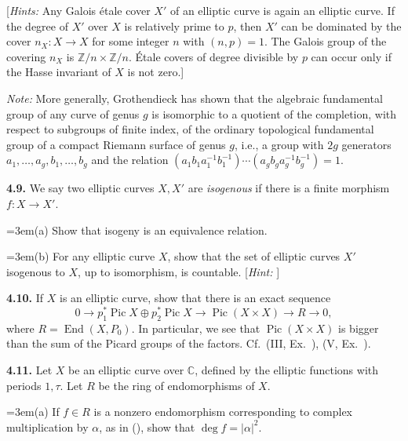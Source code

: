 {[\emph{Hints:} Any Galois \'etale cover $X'$ of an elliptic curve is again an elliptic curve. If the degree of $X'$ over $X$ is relatively prime to $p$, then $X'$ can be dominated by the cover $n_X\colon X\to X$ for some integer $n$ with $(n,p)=1$. The Galois group of the covering $n_X$ is $\mathbb Z/n\times\mathbb Z/n$. \'Etale covers of degree divisible by $p$ can occur only if the Hasse invariant of $X$ is not zero.]

\emph{Note:} More generally, Grothendieck has shown  that the algebraic fundamental group of any curve of genus $g$ is isomorphic to a quotient of the completion, with respect to subgroups of finite index, of the ordinary topological fundamental group of a compact Riemann surface of genus $g$, i.e., a group with $2g$ generators $a_1,\ldots,a_g,b_1,\ldots,b_g$ and the relation $(a_1b_1a_1^{-1}b_1^{-1})\cdots(a_gb_ga_g^{-1}b_g^{-1})=1$.

\smallskip
\noindent\hypertarget{ex-IV-4.9}{}\textbf{4.9.} We say two elliptic curves $X,X'$ are \emph{isogenous} if there is a finite morphism $f\colon X\to X'$.

\noindent\hangindent=3em\hspace*{1.7em}(a) Show that isogeny is an equivalence relation.

\noindent\hangindent=3em\hspace*{1.7em}(b) For any elliptic curve $X$, show that the set of elliptic curves $X'$ isogenous to $X$, up to isomorphism, is countable. [\emph{Hint:} ]

\smallskip
\noindent\hypertarget{ex-IV-4.10}{}\textbf{4.10.} If $X$ is an elliptic curve, show that there is an exact sequence
\[
0\longrightarrow p_1^*\operatorname{Pic}X\oplus p_2^*\operatorname{Pic}X
\longrightarrow\operatorname{Pic}(X\times X)\longrightarrow R\longrightarrow0,
\]
where $R=\operatorname{End}(X,P_0)$. In particular, we see that $\operatorname{Pic}(X\times X)$ is bigger than the sum of the Picard groups of the factors. Cf.\ (III, Ex.~), (V, Ex.~).

\smallskip
\noindent\hypertarget{ex-IV-4.11}{}\textbf{4.11.} Let $X$ be an elliptic curve over $\mathbb C$, defined by the elliptic functions with periods $1,\tau$. Let $R$ be the ring of endomorphisms of $X$.

\noindent\hangindent=3em\hspace*{1.7em}(a) If $f\in R$ is a nonzero endomorphism corresponding to complex multiplication by $\alpha$, as in (), show that $\deg f=|\alpha|^2$.}
